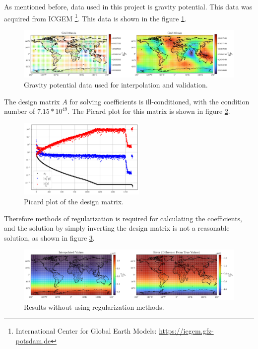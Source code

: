 \documentclass[12pt]{article}
\begin{document}
	As mentioned before, data used in this project is gravity potential. This data was acquired from ICGEM \footnote{International Center for Global Earth Models: \url{https://icgem.gfz-potsdam.de}}. This data is shown in the figure \ref{fig:MainData}.

	\begin{figure}[h!]
		\centering
		\includegraphics[width=16cm]{../Outputs/MainData.pdf}
		\caption{Gravity potential data used for interpolation and validation.}
		\label{fig:MainData}
	\end{figure}
	
	The design matrix $A$ for solving coefficients is ill-conditioned, with the condition number of $7.15*10^{49}$. The Picard plot for this matrix is shown in figure \ref{fig:PicardPlot}. 

	\begin{figure}[h!]
		\centering
		\includegraphics[height=3.8cm]{../Outputs/PicardPlot.pdf}
		\caption{Picard plot of the design matrix.}
		\label{fig:PicardPlot}
	\end{figure}
	
	Therefore methods of regularization is required for calculating the coefficients, and the solution by simply inverting the design matrix is not a reasonable solution, as shown in figure \ref{fig:NoRegResult}.  
	
	\begin{figure}[h!]
		\centering
		\includegraphics[width=15cm]{../Outputs/NoRegResult.pdf}
		\caption{Results without using regularization methods.}
		\label{fig:NoRegResult}
	\end{figure}
	
\end{document}
